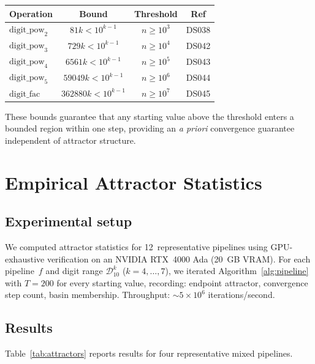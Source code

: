 \documentclass[11pt,a4paper]{amsart}
\theoremstyle{plain}
\theoremstyle{definition}
\theoremstyle{remark}
\begin{document}
\begin{center}
\begin{tabular}{@{}lccc@{}}
\toprule
Operation & Bound & Threshold & Ref \\
\midrule
$\text{digit\_pow}_2$ & $81k < 10^{k-1}$ & $n \geq 10^3$ & DS038 \\
$\text{digit\_pow}_3$ & $729k < 10^{k-1}$ & $n \geq 10^4$ & DS042 \\
$\text{digit\_pow}_4$ & $6561k < 10^{k-1}$ & $n \geq 10^5$ & DS043 \\
$\text{digit\_pow}_5$ & $59049k < 10^{k-1}$ & $n \geq 10^6$ & DS044 \\
$\text{digit\_fac}$   & $362880k < 10^{k-1}$ & $n \geq 10^7$ & DS045 \\
\bottomrule
\end{tabular}
\end{center}

These bounds guarantee that any starting value above the threshold enters a
bounded region within one step, providing an \emph{a priori} convergence
guarantee independent of attractor structure.

\section{Empirical Attractor Statistics}\label{sec:empirical}

\subsection{Experimental setup}

We computed attractor statistics for 12~representative pipelines using
GPU-exhaustive verification on an NVIDIA RTX~4000 Ada (20~GB VRAM). For each
pipeline~$f$ and digit range $\mathcal{D}_{10}^k$ ($k = 4, \ldots, 7$), we
iterated Algorithm~\ref{alg:pipeline} with $T = 200$ for every starting
value, recording: endpoint attractor, convergence step count, basin
membership. Throughput: ${\sim}5 \times 10^6$ iterations/second.

\subsection{Results}

Table~\ref{tab:attractors} reports results for four representative mixed
pipelines.
\end{document}
